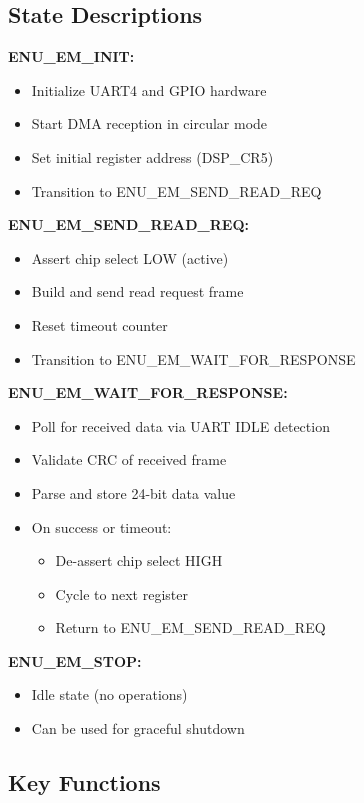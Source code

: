 \documentclass[11pt,a4paper]{article}
\begin{document}
\subsection{State Descriptions}

\textbf{ENU\_EM\_INIT:}
\begin{itemize}[noitemsep]
    \item Initialize UART4 and GPIO hardware
    \item Start DMA reception in circular mode
    \item Set initial register address (DSP\_CR5)
    \item Transition to ENU\_EM\_SEND\_READ\_REQ
\end{itemize}

\textbf{ENU\_EM\_SEND\_READ\_REQ:}
\begin{itemize}[noitemsep]
    \item Assert chip select LOW (active)
    \item Build and send read request frame
    \item Reset timeout counter
    \item Transition to ENU\_EM\_WAIT\_FOR\_RESPONSE
\end{itemize}

\textbf{ENU\_EM\_WAIT\_FOR\_RESPONSE:}
\begin{itemize}[noitemsep]
    \item Poll for received data via UART IDLE detection
    \item Validate CRC of received frame
    \item Parse and store 24-bit data value
    \item On success or timeout:
    \begin{itemize}
        \item De-assert chip select HIGH
        \item Cycle to next register
        \item Return to ENU\_EM\_SEND\_READ\_REQ
    \end{itemize}
\end{itemize}

\textbf{ENU\_EM\_STOP:}
\begin{itemize}[noitemsep]
    \item Idle state (no operations)
    \item Can be used for graceful shutdown
\end{itemize}

\subsection{Key Functions}
\end{document}
